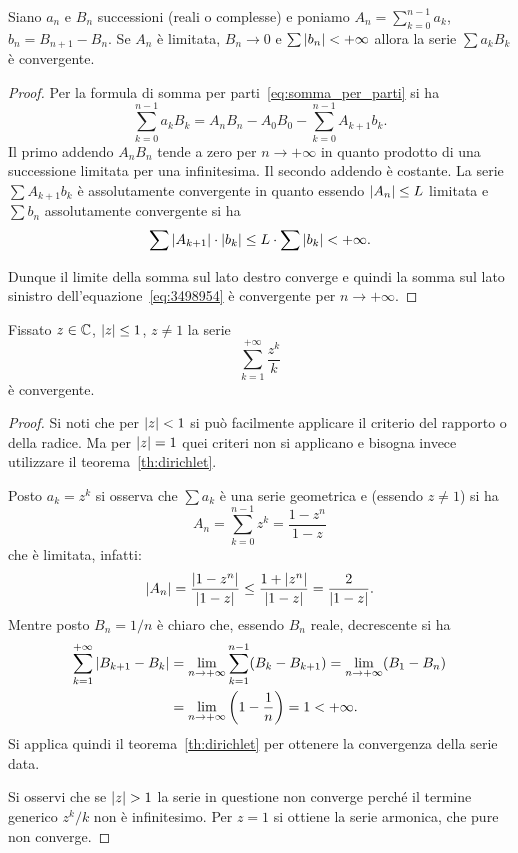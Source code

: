 \begin{theorem}%
\label{th:dirichlet}%
Siano $a_n$ e $B_n$ successioni (reali o complesse)
e poniamo $\displaystyle A_n = \sum_{k=0}^{n-1} a_k$,
$b_n = B_{n+1} - B_n$.
Se $A_n$ è limitata,
$B_n\to 0$
e $\sum {\left|b_n\right|} < +\infty$
allora la serie $\sum a_k B_k$ è convergente.
\end{theorem}
%
\begin{proof}
Per la formula di somma per parti~\eqref{eq:somma_per_parti}
 si ha
\begin{equation}\label{eq:3498954}
 \sum_{k=0}^{n-1} a_k B_k
 = A_n B_n - A_0 B_0 - \sum_{k=0}^{n-1} A_{k+1}b_k.
\end{equation}
Il primo addendo $A_n B_n$ tende a zero per $n\to +\infty$
in quanto prodotto di una successione limitata per una infinitesima.
Il secondo addendo è costante.
La serie $\sum A_{k+1} b_k$ è assolutamente convergente
in quanto essendo ${\left|A_n\right|}\le L$ limitata
e $\sum b_n$ assolutamente convergente si ha
\[
  \sum {\left|A_{k+1}\right|} \cdot {\left|b_k\right|}
  \le L \cdot \sum {\left|b_k\right|} < +\infty.
\]

Dunque il limite della somma sul lato destro converge e quindi
la somma sul lato sinistro
dell'equazione~\eqref{eq:3498954}
è convergente per $n\to +\infty$.
\end{proof}

\begin{exercise}
Fissato $z\in {\mathbb C}$, ${\left|z\right|} \le 1$, $z\neq 1$ la serie
\[
  \sum_{k=1}^{+\infty} \frac{z^k}{k}
\]
è convergente.
\end{exercise}
\begin{proof}
Si noti che per ${\left|z\right|}<1$ si può facilmente applicare
il criterio del rapporto o della radice.
Ma per ${\left|z\right|}=1$ quei criteri non si applicano e
bisogna invece utilizzare il teorema~\ref{th:dirichlet}.

Posto $a_k=z^k$ si osserva che $\sum a_k$ è una
serie geometrica e (essendo $z\neq 1$) si ha
\[
  A_n = \sum_{k=0}^{n-1} z^k = \frac{1-z^n}{1-z}
\]
che è limitata, infatti:
\[
  {\left|A_n\right|} = \frac{{\left|1-z^n\right|}}{{\left|1-z\right|}} \le \frac{1+{\left|z^n\right|}}{{\left|1-z\right|}}
  = \frac{2}{{\left|1-z\right|}}.
\]
Mentre posto $B_n = 1/n$ è chiaro che, essendo $B_n$ reale,
decrescente si ha
\begin{align*}
\sum_{k=1}^{+\infty} {\left|B_{k+1}-B_{k}\right|}
&= \lim_{n\to +\infty}\sum_{k=1}^{n-1} (B_k-B_{k+1})
= \lim_{n\to +\infty}(B_1 - B_n)\\
&= \lim_{n\to +\infty}{\left( 1 - \frac{1}{n} \right)} = 1
< +\infty.
\end{align*}
Si applica quindi il teorema~\ref{th:dirichlet}
per ottenere la convergenza
della serie data.

Si osservi che se ${\left|z\right|}>1$ la serie in questione non
converge perché il termine generico $z^k/k$ non è infinitesimo.
Per $z=1$ si ottiene la serie armonica, che pure non converge.
\end{proof}

